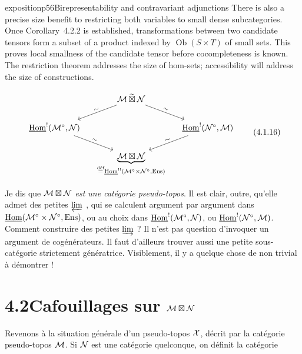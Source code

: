 \begin{dcomment}{exposition}{p56}{Birepresentability and contravariant adjunctions}
There is also a precise size benefit to restricting both variables to small dense subcategories. Once Corollary~4.2.2 is established, transformations between two candidate tensors form a subset of a product indexed by $\operatorname{Ob}(S\times T)$ of small sets. This proves local smallness of the candidate tensor before cocompleteness is known. The restriction theorem addresses the size of hom-sets; accessibility will address the size of constructions.
\end{dcomment}


\[
\begin{tikzcd}[column sep=small]
 & \cM \tbt \cN \arrow[dl, "\sim" sloped] \arrow[dr, "\sim" sloped] & \\
\uHom^{!}(\cM^{\circ},\cN) \arrow[dr, "\sim" sloped] & & \uHom^{!}(\cN^{\circ},\cM) \arrow[dl, "\sim" sloped] \\
 & \underbrace{\cM \bt \cN}_{\defeq \uHom^{!!}(\cM^{\circ}\times\cN^{\circ},\Ens)} &
\end{tikzcd}
\tag*{(4.1.16)}
\]



Je dis que $\mathcal{M} \boxtimes \mathcal{N}$ \textit{est une catégorie pseudo-topos}. Il est clair, outre, qu'elle admet des petites $\varprojlim$ , qui se calculent argument par argument dans $\underline{\mathrm{Hom}}(\mathcal{M}^{\circ}\times\mathcal{N}^{\circ},\mathrm{Ens})$, ou au choix dans $\underline{\mathrm{Hom}}^{!}(\mathcal{M}^{\circ},\mathcal{N})$, ou $\underline{\mathrm{Hom}}^{!}(\mathcal{N}^{\circ},\mathcal{M})$. Comment construire des petites $\varinjlim$ ? Il n'est pas question d'invoquer un argument de cogénérateurs. Il faut d'ailleurs trouver aussi une petite sous-catégorie strictement génératrice. Visiblement, il y a quelque chose de non trivial à démontrer !

\section*{4.2\quad Cafouillages sur $\mathcal{M} \boxtimes \mathcal{N}$}

Revenons à la situation générale d'un pseudo-topos $\mathcal{X}$, décrit par la catégorie pseudo-topos $\mathcal{M}$. Si $\mathcal{N}$ est une catégorie quelconque, on définit la catégorie

